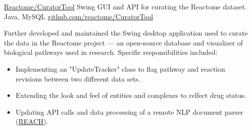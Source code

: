 \showoff
{\textcolor{my-blue}{\href{https://reactome.org/}{Reactome/CuratorTool}}}
{Swing GUI and API for curating the Reactome dataset.}
{Java, MySQL}
{\textcolor{my-blue}{\href{https://github.com/reactome/CuratorTool}{github.com/reactome/CuratorTool}}}

Further developed and maintained the Swing desktop application used to curate the data in the Reactome project — an open-source database and visualizer of biological pathways used in research. Specific responsibilities included:

\begin{itemize}[label=$\triangleright$]
\item Implementing an "UpdateTracker" class to flag pathway and reaction revisions between two different data sets.
\item Extending the look and feel of entities and complexes to relfect drug status.
\item Updating API calls and data processing of a remote NLP document parser (\textcolor{my-blue}{\href{https://github.com/clulab/reach}{REACH}}).
\end{itemize}

